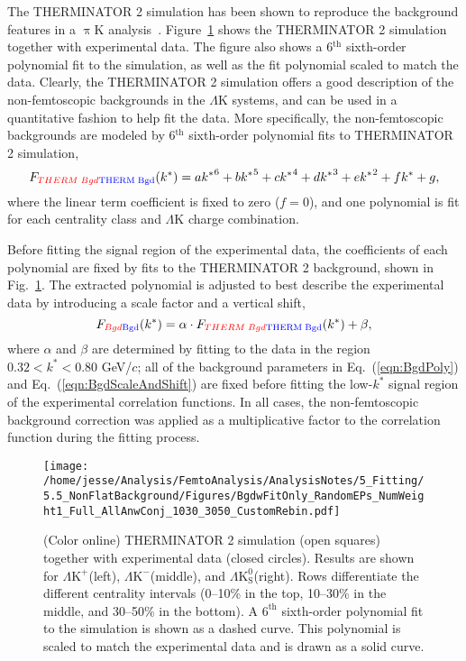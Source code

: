 \documentclass[ALICE,manyauthors]{cernphprep}
\newcommand{\kstar}{$k^{*}$\xspace}
\newcommand{\LamK}{$\Lambda$K\xspace}
\newcommand{\LamKchP}{$\Lambda\mathrm{K^{+}}$\xspace}
\newcommand{\LamKchM}{$\Lambda\mathrm{K^{-}}$\xspace}
\newcommand{\LamKs}{$\Lambda\mathrm{K^{0}_{S}}$\xspace}
\begin{document}
The THERMINATOR 2 simulation has been shown to reproduce the background features in a $\uppi$K analysis~\cite{Kisiel:2017}. 
Figure~\ref{fig:BgdswTHERM} shows the THERMINATOR 2 simulation together with experimental data.  
The figure also shows a {\color{red}6$^{\mathrm{th}}$} {\color{blue}sixth}-order polynomial fit to the simulation, as well as the fit polynomial scaled to match the data.
Clearly, the THERMINATOR 2 simulation offers a good description of the non-femtoscopic backgrounds in the \LamK systems, and can be used in a quantitative fashion to help fit the data.
More specifically, the non-femtoscopic backgrounds are modeled by {\color{red}6$^{\mathrm{th}}$} {\color{blue}sixth}-order polynomial fits to THERMINATOR 2 simulation,
\begin{equation}
F_{\scaleto{{\color{red}THERM\; Bgd}{\color{blue}\mathrm{THERM\; Bgd}}}{6pt}}(k^{*}) = a{k^{*}}^{6}+ b{k^{*}}^{5} + c{k^{*}}^{4} + d{k^{*}}^{3} + e{k^{*}}^{2} + fk^{*} + g,
\label{eqn:BgdPoly}
\end{equation}
where the linear term coefficient is fixed to zero ($f=0$), and one polynomial is fit for each centrality class and \LamK charge combination.

Before fitting the signal region of the experimental data, the coefficients of each polynomial are fixed by fits to the THERMINATOR 2 background, shown in Fig.~\ref{fig:BgdswTHERM}.
The extracted polynomial is adjusted to best describe the experimental data by introducing a scale factor and a vertical shift,
\begin{equation}
F_{\scaleto{{\color{red}Bgd}{\color{blue}\mathrm{Bgd}}}{6pt}}(k^{*}) = \alpha\cdot F_{\scaleto{{\color{red}THERM\; Bgd}{\color{blue}\mathrm{THERM\; Bgd}}}{6pt}}(k^{*}) + \beta,
\label{eqn:BgdScaleAndShift}
\end{equation}
where $\alpha$ and $\beta$ are determined by fitting to the data in the region $0.32 < k^{*} < 0.80$ GeV/$c$; all of the background parameters in Eq.~(\ref{eqn:BgdPoly}) and Eq.~(\ref{eqn:BgdScaleAndShift}) are fixed before fitting the low-\kstar signal region of the experimental correlation functions.
In all cases, the non-femtoscopic background correction was applied as a multiplicative factor to the correlation function during the fitting process.


\begin{figure}[h]
  \centering
  \texttt{[image: /home/jesse/Analysis/FemtoAnalysis/AnalysisNotes/5\_Fitting/5.5\_NonFlatBackground/Figures/BgdwFitOnly\_RandomEPs\_NumWeight1\_Full\_AllAnwConj\_1030\_3050\_CustomRebin.pdf]}
  \caption[Backgrounds with THERMINATOR 2]
  {
  (Color online) THERMINATOR 2 simulation (open squares) together with experimental data (closed circles).  
  Results are shown for \LamKchP (left), \LamKchM (middle), and \LamKs (right).
  Rows differentiate the different centrality intervals (0--10\% in the top, 10--30\% in the middle, and 30--50\% in the bottom).
  A {\color{red}$6^{\mathrm{th}}$} {\color{blue}sixth}-order polynomial fit to the simulation is shown as a dashed curve.  
  This polynomial is scaled to match the experimental data and is drawn as a solid curve.
  }
  \label{fig:BgdswTHERM}
\end{figure} 
\end{document}
